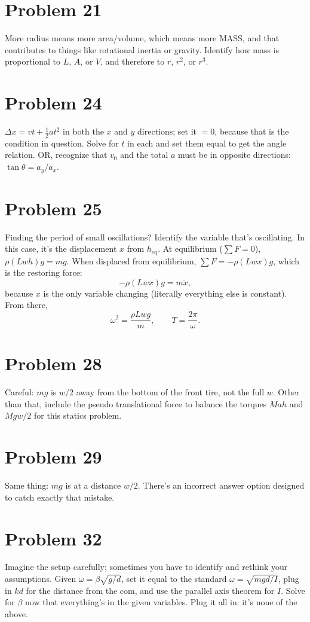 \documentclass[11pt]{article}
\begin{document}
\section*{Problem 21}
More radius means more area/volume, which means more MASS, and that contributes to things like rotational inertia or gravity. Identify how mass is proportional to $L$, $A$, or $V$, and therefore to $r$, $r^2$, or $r^3$.

\section*{Problem 24}
$\Delta x=vt+\tfrac12at^2$ in both the $x$ and $y$ directions; set it $=0$, because that is the condition in question. Solve for $t$ in each and set them equal to get the angle relation.
OR, recognize that $v_0$ and the total $a$ must be in opposite directions: $\tan\theta=a_y/a_x$.

\section*{Problem 25}
Finding the period of small oscillations? Identify the variable that's oscillating. In this case, it's the displacement $x$ from $h_{\text{eq}}$.
At equilibrium ($\sum F=0$), $\rho(Lwh)g=mg$.
When displaced from equilibrium, $\sum F=-\rho(Lwx)g$, which is the restoring force:
\[
-\rho(Lwx)g=m\ddot x,
\]
because $x$ is the only variable changing (literally everything else is constant). From there,
\[
\omega^2=\frac{\rho Lwg}{m},\qquad T=\frac{2\pi}{\omega}.
\]

\section*{Problem 28}
Careful: $mg$ is $w/2$ away from the bottom of the front tire, not the full $w$. Other than that, include the pseudo translational force to balance the torques $Mah$ and $Mgw/2$ for this statics problem.

\section*{Problem 29}
Same thing: $mg$ is at a distance $w/2$. There's an incorrect answer option designed to catch exactly that mistake.

\section*{Problem 32}
Imagine the setup carefully; sometimes you have to identify and rethink your assumptions.
Given $\omega=\beta\sqrt{g/d}$, set it equal to the standard $\omega=\sqrt{mgd/I}$, plug in $kd$ for the distance from the com, and use the parallel axis theorem for $I$. Solve for $\beta$ now that everything's in the given variables. Plug it all in: it's none of the above.
\end{document}

